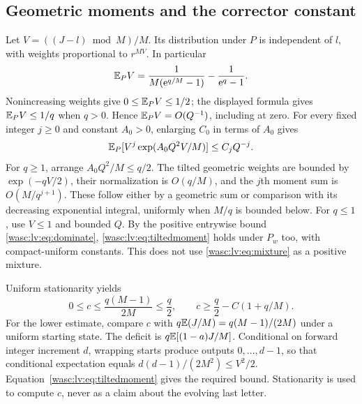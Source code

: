 \documentclass[11pt,a4paper]{article}
\theoremstyle{remark}\newtheorem{remark}[theorem]{Remark}
\numberwithin{equation}{section}
\begin{document}
\subsection{Geometric moments and the corrector constant}
Let $V=((J-l)\bmod M)/M$. Its distribution under $P$ is independent of $l$, with weights proportional to $r^{MV}$. In particular
\begin{equation}\label{wasc:lv:eq:Vmean}
\mathbb E_PV=\frac1{M(\mathrm e^{q/M}-1)}-\frac1{\mathrm e^q-1}.
\end{equation}
Nonincreasing weights give $0\le\mathbb E_PV\le1/2$; the displayed formula gives
$\mathbb E_PV\le1/q$ when $q>0$. Hence $\mathbb E_PV=O(Q^{-1})$, including at zero.
For every fixed integer $j\ge0$ and constant $A_0>0$, enlarging $C_0$ in terms of $A_0$ gives
\begin{equation}\label{wasc:lv:eq:tiltedmoment}
\mathbb E_P[V^j\exp(A_0Q^2V/M)]\le C_jQ^{-j}.
\end{equation}
For $q\ge1$, arrange $A_0Q^2/M\le q/2$. The tilted geometric weights are bounded by $\exp(-qV/2)$, their normalization is $O(q/M)$, and the $j$th moment sum is $O(M/q^{j+1})$. These follow either by a geometric sum or comparison with its decreasing exponential integral, uniformly when $M/q$ is bounded below. For $q\le1$, use $V\le1$ and bounded $Q$.
By the positive entrywise bound \eqref{wasc:lv:eq:dominate}, \eqref{wasc:lv:eq:tiltedmoment} holds under $P_w$ too, with compact-uniform constants. This does not use \eqref{wasc:lv:eq:mixture} as a positive mixture.

Uniform stationarity yields
\begin{equation}\label{wasc:lv:eq:cbounds}
0\le c\le\frac{q(M-1)}{2M}\le\frac q2,
\qquad c\ge\frac q2-C(1+q/M).
\end{equation}
For the lower estimate, compare $c$ with $q\mathbb E(J/M)=q(M-1)/(2M)$ under a uniform starting state. The deficit is $q\mathbb E[(1-a)J/M]$. Conditional on forward integer increment $d$, wrapping starts produce outputs $0,\ldots,d-1$, so that conditional expectation equals $d(d-1)/(2M^2)\le V^2/2$. Equation~\eqref{wasc:lv:eq:tiltedmoment} gives the required bound. Stationarity is used to compute $c$, never as a claim about the evolving last letter.
\end{document}
